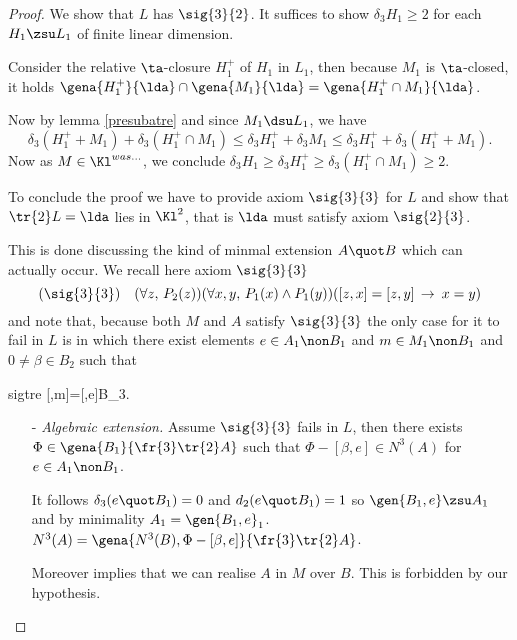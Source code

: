 \begin{proof}

\medskip
We show that $L$ has $\sig{3}{2}$.
It suffices to show $\delta_{3}H_{1}\geq2$ for each  $H_{1}\zsu L_{1}$ of finite linear dimension. 

Consider the relative $\ta$-closure $H_{1}^{+}$ of $H_{1}$ in $L_{1}$, then because $M_{1}$ is
$\ta$-closed, it holds
$\gena{H_{1}^{+}}{\lda}\cap\gena{M_{1}}{\lda}=\gena{H_{1}^{+}\cap M_{1}}{\lda}$.

Now by lemma \ref{presubatre} and since $M_{1}\dsu L_{1}$, we have
$$
\delta_{3}(H_{1}^{+}+M_{1})+\delta_{3}(H_{1}^{+}\cap M_{1})
\leq\delta_{3}H_{1}^{+}+\delta_{3}M_{1}\leq\delta_{3}H_{1}^{+}+\delta_{3}(H_{1}^{+}+M_{1}).
$$
Now as $M\in\Kl^{was\dots}$, we conclude
$\delta_{3}H_{1}\geq\delta_{3}H_{1}^{+}\geq\delta_{3}(H_{1}^{+}\cap M_{1})\geq2$.

\bigskip
To conclude the proof we have to provide axiom $\sig{3}{3}$ for $L$
and show that $\tr{2}L=\lda$ lies in $\Kl^{2}$, that is $\lda$ must satisfy axiom $\sig{2}{3}$.

This is done discussing the kind of minmal extension $A\quot B$ which can actually occur.
We recall here axiom $\sig{3}{3}$
$$(\sig{3}{3})\quad(\forall z,\,P_{2}(z))(\forall x,y,\,P_{1}(x)\wedge P_{1}(y))([z,x]=[z,y]\,\rightarrow
\:x=y)$$
and note that, because both $M$ and $A$ satisfy $\sig{3}{3}$ the only case for it to fail in $L$ is in which
there exist elements $e\in A_{1}\non B_{1}$ and $m\in M_{1}\non B_{1}$ and $0\neq\beta\in B_{2}$ such
that
\begin{labeq}{sigtre}
[\beta,m]=[\beta,e]\in B_{3}.
\end{labeq}

\begin{itemize}
\item[-]\emph{Algebraic extension.}
Assume $\sig{3}{3}$ fails in $L$, then there exists $\Phi\in\gena{B_{1}}{\fr{3}\tr{2}A}$ such that  $\Phi-[\beta,e]\in N^{3}(A)$
for $e\in A_{1}\non B_{1}$.

It follows $\delta_{3}(e\quot B_{1})=0$ and $d_{2}(e\quot B_{1})=1$ so
$\gen{B_{1},e}\zsu A_{1}$ and by minimality $A_{1}=\gen{B_{1},e}_{1}$.
$N^{3}(A)=\gena{N^{3}(B),\Phi-[\beta,e]}{\fr{3}\tr{2}A}$.

Moreover  implies that we can realise $A$ in $M$ over $B$.
This is forbidden by our hypothesis.  


\end{itemize}
\end{proof}
